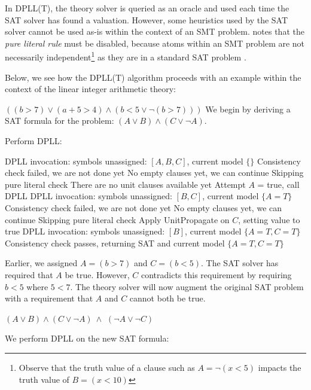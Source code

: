 \documentclass[a4paper,openany,12pt]{book}
\begin{document}
In DPLL(T), the theory solver is queried as an oracle and used each time the SAT solver has found a valuation.
However, some heuristics used by the SAT solver cannot be used as-is within the context of an SMT problem.
\citeauthor{barrett2002sat} notes that the \emph{pure literal rule} must be disabled, because atoms within an SMT
problem are not necessarily independent\footnote{Observe that the truth value of a clause such as $A = \neg (x < 5)$ impacts the truth value of $B = (x < 10)$}
as they are in a standard SAT problem \citep{barrett2002sat}.

Below, we see how the DPLL(T) algorithm proceeds with an example within the context of the linear integer arithmetic
theory:

\begin{example}{$((b > 7) \lor (a + 5 > 4) \land (b < 5 \lor \neg (b > 7)))$}
    We begin by deriving a SAT formula for the problem: $(A \lor B) \land (C \lor \neg A)$.

    Perform DPLL:

    \begin{outline}
        \1[\cogs] DPLL invocation: symbols unassigned: $[A, B, C]$, current model $\{\}$
        \1[\arrow] Consistency check failed, we are not done yet
        \1[\arrow] No empty clauses yet, we can continue
        \1[\forward] Skipping pure literal check
        \1[\arrow] There are no unit clauses available yet
        \1[\arrow] Attempt $A$ = true, call DPLL
        \2[\cogs] DPLL invocation: symbols unassigned: $[B, C]$, current model $\{A=T\}$
        \2[\arrow] Consistency check failed, we are not done yet
        \2[\arrow] No empty clauses yet, we can continue
        \2[\forward] Skipping pure literal check
        \2[\arrow] Apply UnitPropagate on $C$, setting value to true
        \3[\cogs] DPLL invocation: symbols unassigned: $[B]$, current model $\{A=T, C=T\}$
        \3[\checkMark] Consistency check passes, returning SAT and current model $\{A=T, C=T\}$
    \end{outline}


    Earlier, we assigned $A = (b > 7)$ and $C = (b < 5)$.
    The SAT solver has required that $A$ be true.
    However, $C$ contradicts this requirement by requiring $b < 5$ where $5 < 7$.
    The theory solver will now augment the original SAT problem with a requirement that $A$ and $C$ cannot both be true.

    \((A \lor B) \land (C \lor \neg A)~\land \) \colorbox{white}{$(\neg A \lor \neg C)$}

    We perform DPLL on the new SAT formula:


\end{example}
\end{document}

